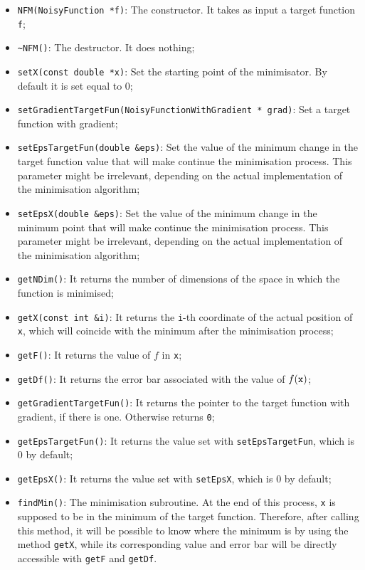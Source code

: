 \documentclass[11pt,a4paper,twoside]{article}
\begin{document}
\begin{itemize}
   \item \verb+NFM(NoisyFunction *f)+: The constructor. It takes as input a target function \verb+f+;
   \item \verb+~NFM()+: The destructor. It does nothing;
   \item \verb+setX(const double *x)+: Set the starting point of the minimisator. By default it is set equal to $0$;
   \item \verb+setGradientTargetFun(NoisyFunctionWithGradient * grad)+: Set a target function with gradient;
   \item \verb+setEpsTargetFun(double &eps)+: Set the value of the minimum change in the target function value that will make continue the minimisation process. This parameter might be irrelevant, depending on the actual implementation of the minimisation algorithm;
   \item \verb+setEpsX(double &eps)+: Set the value of the minimum change in the minimum point that will make continue the minimisation process. This parameter might be irrelevant, depending on the actual implementation of the minimisation algorithm;
   \item \verb+getNDim()+: It returns the number of dimensions of the space in which the function is minimised;
   \item \verb+getX(const int &i)+: It returns the \verb+i+-th coordinate of the actual position of \verb+x+, which will coincide with the minimum after the minimisation process;
   \item \verb+getF()+: It returns the value of $f$ in \verb+x+;
   \item \verb+getDf()+: It returns the error bar associated with the value of $f(\verb+x+)$;
   \item \verb+getGradientTargetFun()+: It returns the pointer to the target function with gradient, if there is one. Otherwise returns \verb+0+;
   \item \verb+getEpsTargetFun()+: It returns the value set with \verb+setEpsTargetFun+, which is $0$ by default;
   \item \verb+getEpsX()+: It returns the value set with \verb+setEpsX+, which is $0$ by default;
   \item \verb+findMin()+: The minimisation subroutine. At the end of this process, \verb+x+ is supposed to be in the minimum of the target function. Therefore, after calling this method, it will be possible to know where the minimum is by using the method \verb+getX+, while its corresponding value and error bar will be directly accessible with \verb+getF+ and \verb+getDf+.
\end{itemize}
\end{document}
